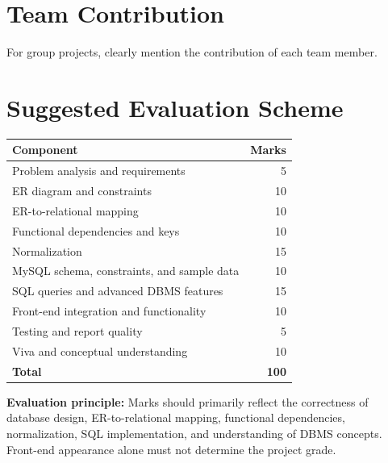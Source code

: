 \documentclass[12pt,a4paper]{report}
\begin{document}
\chapter{Team Contribution}
For group projects, clearly mention the contribution of each team member.

\chapter*{Suggested Evaluation Scheme}

\begin{center}
\begin{tabular}{p{10cm}r}
\toprule
\textbf{Component} & \textbf{Marks} \\
\midrule
Problem analysis and requirements & 5 \\
ER diagram and constraints & 10 \\
ER-to-relational mapping & 10 \\
Functional dependencies and keys & 10 \\
Normalization & 15 \\
MySQL schema, constraints, and sample data & 10 \\
SQL queries and advanced DBMS features & 15 \\
Front-end integration and functionality & 10 \\
Testing and report quality & 5 \\
Viva and conceptual understanding & 10 \\
\midrule
\textbf{Total} & \textbf{100} \\
\bottomrule
\end{tabular}
\end{center}

\noindent\textbf{Evaluation principle:} Marks should primarily reflect the correctness of database design, ER-to-relational mapping, functional dependencies, normalization, SQL implementation, and understanding of DBMS concepts. Front-end appearance alone must not determine the project grade.
\end{document}

